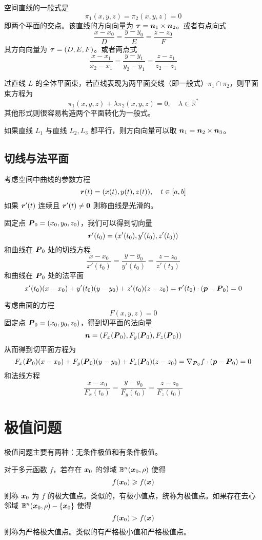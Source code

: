 空间直线的一般式是
\[ \pi_1(x, y, z) = \pi_2(x, y, z) = 0 \]
即两个平面的交点。该直线的方向向量为 $\boldsymbol{\tau} = \boldsymbol{n}_1 \times \boldsymbol{n}_2$。或者有点向式
\[ \frac{x - x_0}{D} = \frac{y - y_0}{E} = \frac{z - z_0}{F} \]
其方向向量为 $\boldsymbol{\tau} = (D, E, F)$。或者两点式
\[ \frac{x - x_1}{x_2 - x_1} = \frac{y - y_1}{y_2 - y_1} = \frac{z - z_1}{z_2 - z_1} \]

过直线 $L$ 的全体平面束，若直线表现为两平面交线（即一般式）$\pi_1 \cap \pi_2$，则平面束方程为
\[ \pi_1(x, y, z) + \lambda \pi_2(x, y, z) = 0, \quad \lambda \in \mathbb{R}^\ast \]
其他形式则很容易构造两个平面转化为一般式。

如果直线 $L_1$ 与直线 $L_2, L_3$ 都平行，则方向向量可以取 $\boldsymbol{n}_1 = \boldsymbol{n}_2 \times \boldsymbol{n}_3$。

\subsection{切线与法平面}

考虑空间中曲线的参数方程
\[ \boldsymbol{r}(t) = (x(t), y(t), z(t)), \quad t \in [a, b] \]
如果 $\boldsymbol{r}'(t)$ 连续且 $\boldsymbol{r}'(t) \neq \boldsymbol{0}$ 则称曲线是光滑的。

固定点 $\boldsymbol{P}_0 = (x_0, y_0, z_0)$，我们可以得到切向量
\[ \boldsymbol{r}'(t_0) = (x'(t_0), y'(t_0), z'(t_0)) \]
和曲线在 $\boldsymbol{P}_0$ 处的切线方程
\[ \frac{x - x_0}{x'(t_0)} = \frac{y - y_0}{y'(t_0)} = \frac{z - z_0}{z'(t_0)} \]
和曲线在 $\boldsymbol{P}_0$ 处的法平面
\[ x'(t_0)(x - x_0) + y'(t_0)(y - y_0) + z'(t_0)(z - z_0) = \boldsymbol{r}'(t_0) \cdot (\boldsymbol{p} - \boldsymbol{P}_0) = 0 \]

考虑曲面的方程
\[ F(x, y, z) = 0 \]
固定点 $\boldsymbol{P}_0 = (x_0, y_0, z_0)$，得到切平面的法向量
\[ \boldsymbol{n} = (F_x(\boldsymbol{P}_0), F_y(\boldsymbol{P}_0), F_z(\boldsymbol{P}_0)) \]
从而得到切平面方程为
\[ F_x(\boldsymbol{P}_0)(x-x_0) + F_y(\boldsymbol{P}_0)(y-y_0) + F_z(\boldsymbol{P}_0)(z-z_0) = \nabla_{\boldsymbol{P}_0}f \cdot (\boldsymbol{p} - \boldsymbol{P}_0) = 0 \]
和法线方程
\[ \frac{x - x_0}{F_x(t_0)} = \frac{y - y_0}{F_y(t_0)} = \frac{z - z_0}{F_z(t_0)} \]

\section{极值问题}

极值问题主要有两种：无条件极值和有条件极值。

对于多元函数 $f$，若存在 $\boldsymbol{x}_0$ 的邻域 $\mathbb{B}^n(\boldsymbol{x}_0, \rho)$ 使得
\[ f(\boldsymbol{x}_0) \geqslant f(\boldsymbol{x}) \]
则称 $\boldsymbol{x}_0$ 为 $f$ 的极大值点。类似的，有极小值点，统称为极值点。如果存在去心邻域 $\mathbb{B}^n(\boldsymbol{x}_0, \rho) - \{\boldsymbol{x}_0\}$ 使得
\[ f(\boldsymbol{x}_0) > f(\boldsymbol{x}) \]
则称为严格极大值点。类似的有严格极小值和严格极值点。

